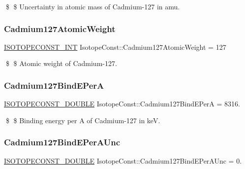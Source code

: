 \$ \$ Uncertainty in atomic mass of Cadmium-\/127 in amu. \mbox{\label{group___isotope_const-_cadmium-_cd127_gadfbe90483ccb59461cb5076d5abccdf1}} 
\subsubsection{\texorpdfstring{Cadmium127\+Atomic\+Weight}{Cadmium127AtomicWeight}}
{\footnotesize\ttfamily \mbox{\hyperlink{group___isotope_const-_macros_ga5f18360b3e99483a35c32d789e62621c}{I\+S\+O\+T\+O\+P\+E\+C\+O\+N\+S\+T\+\_\+\+I\+NT}} Isotope\+Const\+::\+Cadmium127\+Atomic\+Weight = 127}

\$ \$ Atomic weight of Cadmium-\/127. \mbox{\label{group___isotope_const-_cadmium-_cd127_gab06e9fe7cbefd68e0ca368f089910a8f}} 
\subsubsection{\texorpdfstring{Cadmium127\+Bind\+E\+PerA}{Cadmium127BindEPerA}}
{\footnotesize\ttfamily \mbox{\hyperlink{group___isotope_const-_macros_ga8f45a7272ce02c0b4c65c44636ed719a}{I\+S\+O\+T\+O\+P\+E\+C\+O\+N\+S\+T\+\_\+\+D\+O\+U\+B\+LE}} Isotope\+Const\+::\+Cadmium127\+Bind\+E\+PerA = 8316.}

\$ \$ Binding energy per A of Cadmium-\/127 in keV. \mbox{\label{group___isotope_const-_cadmium-_cd127_ga3821d42e3b16dc16ef608cdc8c70ae99}} 
\subsubsection{\texorpdfstring{Cadmium127\+Bind\+E\+Per\+A\+Unc}{Cadmium127BindEPerAUnc}}
{\footnotesize\ttfamily \mbox{\hyperlink{group___isotope_const-_macros_ga8f45a7272ce02c0b4c65c44636ed719a}{I\+S\+O\+T\+O\+P\+E\+C\+O\+N\+S\+T\+\_\+\+D\+O\+U\+B\+LE}} Isotope\+Const\+::\+Cadmium127\+Bind\+E\+Per\+A\+Unc = 0.}

